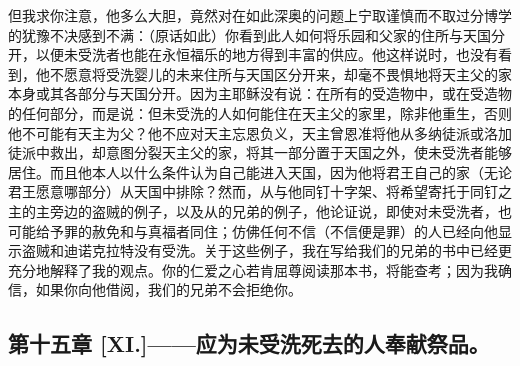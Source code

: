 但我求你注意，他多么大胆，竟然对在如此深奥的问题上宁取谨慎而不取过分博学的犹豫不决感到不满：（原话如此）你看到此人如何将乐园和父家的住所与天国分开，以便未受洗者也能在永恒福乐的地方得到丰富的供应。他这样说时，也没有看到，他不愿意将受洗婴儿的未来住所与天国区分开来，却毫不畏惧地将天主父的家本身或其各部分与天国分开。因为主耶稣没有说：在所有的受造物中，或在受造物的任何部分，而是说：但未受洗的人如何能住在天主父的家里，除非他重生，否则他不可能有天主为父？他不应对天主忘恩负义，天主曾恩准将他从多纳徒派或洛加徒派中救出，却意图分裂天主父的家，将其一部分置于天国之外，使未受洗者能够居住。而且他本人以什么条件认为自己能进入天国，因为他将君王自己的家（无论君王愿意哪部分）从天国中排除？然而，从与他同钉十字架、将希望寄托于同钉之主的主旁边的盗贼的例子，以及从的兄弟的例子，他论证说，即使对未受洗者，也可能给予罪的赦免和与真福者同住；仿佛任何不信（不信便是罪）的人已经向他显示盗贼和迪诺克拉特没有受洗。关于这些例子，我在写给我们的兄弟的书中已经更充分地解释了我的观点。你的仁爱之心若肯屈尊阅读那本书，将能查考；因为我确信，如果你向他借阅，我们的兄弟不会拒绝你。\par


\subsection{第十五章 [XI.]——应为未受洗死去的人奉献祭品。}


